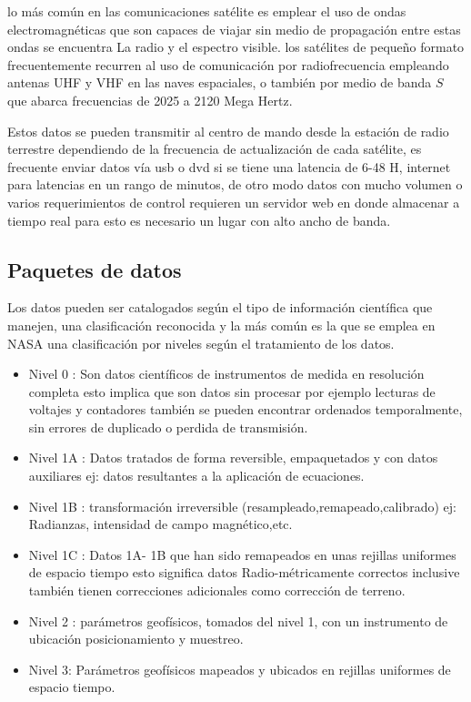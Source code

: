 \documentclass[12pt]{extarticle}
\begin{document}
 lo más común en las comunicaciones satélite es emplear el uso de ondas electromagnéticas que son capaces de viajar sin medio de propagación entre estas ondas se encuentra La radio y el espectro visible. los satélites de pequeño formato frecuentemente recurren al uso de comunicación por  radiofrecuencia empleando antenas UHF y VHF en las naves espaciales, o también por medio de banda $S$ que abarca frecuencias de 2025 a 2120 Mega Hertz. 
 
Estos datos se pueden transmitir al centro de mando desde la estación de radio terrestre dependiendo de la frecuencia de actualización de cada satélite, es frecuente enviar datos vía
 usb o dvd si se tiene una latencia de 6-48 H, internet para latencias en un rango de minutos,  de otro modo datos con mucho volumen o  varios requerimientos de control requieren un servidor web en donde almacenar a tiempo real para esto es necesario un lugar con alto ancho de banda.
 
 \subsection{Paquetes de datos}
Los datos pueden ser catalogados según el tipo de información científica que manejen, una clasificación reconocida y la más común es la que se emplea en NASA una clasificación por niveles según el tratamiento de los datos.
\begin{itemize}
    \item Nivel 0 : Son datos científicos de instrumentos de medida en resolución completa esto implica que son datos sin procesar por ejemplo lecturas de voltajes y contadores también se pueden encontrar ordenados temporalmente, sin errores de duplicado o perdida de transmisión. 
    \item Nivel 1A : Datos tratados de forma reversible, empaquetados y con datos auxiliares ej: datos resultantes a la  aplicación de ecuaciones. 
    
    \item Nivel 1B : transformación irreversible (resampleado,remapeado,calibrado) ej: Radianzas, intensidad de campo magnético,etc.
    \item Nivel 1C : Datos 1A- 1B que han sido remapeados en unas rejillas uniformes de espacio tiempo esto significa datos
    Radio-métricamente correctos inclusive también tienen correcciones adicionales como corrección de terreno.
    \item Nivel 2 : parámetros geofísicos, tomados del nivel 1, con un instrumento de ubicación posicionamiento y muestreo.
    \item Nivel 3: Parámetros geofísicos mapeados y ubicados en rejillas uniformes de espacio tiempo.  
\end{itemize}
\end{document}
